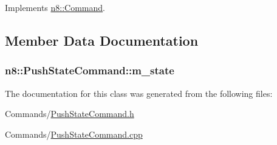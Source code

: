 Implements \hyperlink{classn8_1_1_command_a8a70ef93c997ef2f545154e1c55cdf87}{n8\-::\-Command}.



\subsection{Member Data Documentation}
\hypertarget{classn8_1_1_push_state_command_abd110a1cf9efc34960652d3aa90e4828}{
\subsubsection[{m\-\_\-state}]{ n8\-::\-Push\-State\-Command\-::m\-\_\-state\hspace{0.3cm}{\ttfamily [private]}}}\label{classn8_1_1_push_state_command_abd110a1cf9efc34960652d3aa90e4828}


The documentation for this class was generated from the following files\-:\begin{DoxyCompactItemize}
\item 
Commands/\hyperlink{_push_state_command_8h}{Push\-State\-Command.\-h}\item 
Commands/\hyperlink{_push_state_command_8cpp}{Push\-State\-Command.\-cpp}\end{DoxyCompactItemize}
